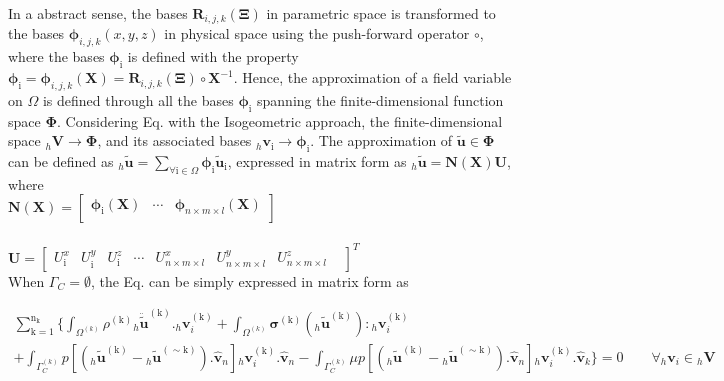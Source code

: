 In a abstract sense, the bases $\bm R_{i,j,k}(\mathbf{\Xi})$ in parametric space is transformed to the bases $\bm \phi_{i,j,k}(x,y,z)$ in physical space using the push-forward operator $\circ$, where the bases $\bm \phi_{\mathrm{i}}$ is defined with the property $\bm \phi_\mathrm{i}=\bm \phi_{i,j,k}(\bm X)= \bm R_{i,j,k}(\mathbf{\Xi}) \circ \bm{X}^{-1}$. Hence, the approximation of a field variable on $\Omega$ is defined through all the bases $\bm \phi_\mathrm{i}$ spanning the finite-dimensional function space $\bm \Phi$.
Considering Eq.   with the Isogeometric approach, the finite-dimensional space ${}_h\bm V \to \bm \Phi$, and its associated bases ${}_h \bm v_{\mathrm{i}} \rightarrow \bm \phi_{\mathrm{i}}$. 
The approximation of $\widetilde{\bm {u}} \in \bm \Phi$ can be defined as ${}_h \widetilde{\bm u} =  \sum_{\forall \mathrm{i} \in \Omega} \bm \phi_{\mathrm{i}} \widetilde{ \bm u}_{\mathrm{i}}$, expressed in matrix form as ${}_h \widetilde{\bm u} = \bm N(\bm X) \bm U$, where\\ 

$ \bm N(\bm X)  
= \begin{bmatrix}
 \bm \phi_{\mathrm{i}}(\bm X) &\cdots   &\bm \phi_{n\times m \times l}(\bm X) \\ 
\end{bmatrix}$\\
\\
$\bm {U} = \begin{bmatrix}
 U_{\mathrm{i}}^x& 
U_{\mathrm{i}}^y& 
U_{\mathrm{i}}^z& 
\cdots& 
U_{n\times m \times l}^x& 
U_{n \times m \times l}^y&
U_{n \times m \times l}^z& 
\end{bmatrix}^T$\\

When $\Gamma_C = \emptyset$, the Eq. can be simply expressed in matrix form as

\begin{multline} \label{weak_pert_2}
\sum_{\mathrm{k}=1}^{\mathrm{n}_{\mathrm{\mathrm{k}}}}   \bigg\{ \int_{\Omega^{(k)}}\rho^\mathrm{(k)} {}_h \bm{\ddot{\widetilde{u}}}^\mathrm{(k)}. {}_h \bm v_i^\mathrm{(k)} +\int_{\Omega^{(k)}} \bm{\sigma}^\mathrm{(k)}({}_h \bm{\widetilde u}^\mathrm{(k)}) : {}_h \bm v_i^\mathrm{(k)}\\  
+\int_{\Gamma^{(k)}_C}  \mathit{p}[({{}_h\widetilde{\bm u}}^{(\mathrm k)} - {{}_h \widetilde{\bm u}}^{ (\sim \mathrm k)}). \bm{\hat{v}}_n]  {}_h \bm v_i^\mathrm{(k)}. \bm{\hat{v}}_n 
-\int_{\Gamma^{(k)}_C}  \mu \mathit{p}[({{}_h\widetilde{\bm u}}^{(\mathrm k)} - {{}_h\widetilde{\bm u}}^{(\sim \mathrm k)}). \bm{\hat{v}}_n]  {}_h \bm v_i^\mathrm{(k)}. \bm{\hat{v}}_k  \bigg\} = 0 \qquad \forall {}_h \bm v_i \in {}_h \bm V
\end{multline} 

